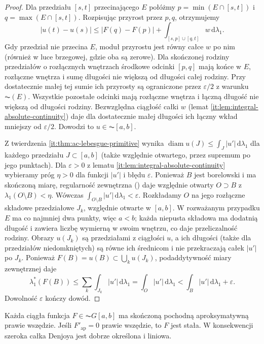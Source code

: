 \begin{proof}
Dla przedziału $[s,t]$ przecinającego $E$ połóżmy
$p=\min(E\cap[s,t])$ i $q=\max(E\cap[s,t])$. Rozpisując przyrost przez $p,q$, otrzymujemy
\[
 |u(t)-u(s)|\le |F(q)-F(p)|+
 \int_{[s,p]\cup[q,t]}w\,\mathrm d\lambda_1.
\]
Gdy przedział nie przecina $E$, moduł przyrostu jest równy całce $w$ po nim (również w luce brzegowej, gdzie oba są zerowe).
Dla skończonej rodziny przedziałów o rozłącznych wnętrzach środkowe odcinki $[p,q]$ mają końce w $E$, rozłączne wnętrza i sumę długości nie większą od długości całej rodziny. Przy dostatecznie małej tej sumie ich przyrosty są ograniczone przez $\varepsilon/2$ z warunku $\AC(E)$. Wszystkie pozostałe odcinki mają rozłączne wnętrza i łączną długość nie większą od długości rodziny. Bezwzględna ciągłość całki $w$ (lemat \ref{it:lem:integral-absolute-continuity}) daje dla dostatecznie małej długości ich łączny wkład mniejszy od $\varepsilon/2$. Dowodzi to $u\in\AC[a,b]$.

Z twierdzenia \ref{it:thm:ac-lebesgue-primitive} wynika $\operatorname{diam}u(J)\le\int_J|u'|\,\mathrm d\lambda_1$ dla każdego przedziału $J\subset[a,b]$ (także względnie otwartego, przez supremum po jego punktach).
Dla $\varepsilon>0$ z lematu \ref{it:lem:integral-absolute-continuity} wybieramy próg $\eta>0$ dla funkcji $|u'|$ i błędu $\varepsilon$. Ponieważ $B$ jest borelowski i ma skończoną miarę, regularność zewnętrzna () daje względnie otwarty $O\supset B$ z $\lambda_1(O\setminus B)<\eta$. Wówczas $\int_{O\setminus B}|u'|\,\mathrm d\lambda_1<\varepsilon$. Rozkładamy $O$ na jego rozłączne składowe przedziałowe $J_k$, względnie otwarte w $[a,b]$. W rozważanym przypadku $E$ ma co najmniej dwa punkty, więc $a<b$; każda niepusta składowa ma dodatnią długość i zawiera liczbę wymierną w swoim wnętrzu, co daje przeliczalność rodziny. Obrazy $u(J_k)$ są przedziałami z ciągłości $u$, a ich długości (także dla przedziałów niedomkniętych) są równe ich średnicom i nie przekraczają całek $|u'|$ po $J_k$. Ponieważ $F(B)=u(B)\subset\bigcup_k u(J_k)$, podaddytywność miary zewnętrznej daje
\[
 \lambda_1^*(F(B))\le\sum_k\int_{J_k}|u'|\,\mathrm d\lambda_1
 =\int_O|u'|\,\mathrm d\lambda_1
 <\int_B|u'|\,\mathrm d\lambda_1+\varepsilon.
\]
Dowolność $\varepsilon$ kończy dowód.
\end{proof}
\begin{twierdzenie}\label{it:thm:acg-uniqueness}
Każda ciągła funkcja $F\in\AC G[a,b]$ ma skończoną pochodną aproksymatywną prawie wszędzie. Jeśli $F'_{\mathrm{ap}}=0$ prawie wszędzie, to $F$ jest stała. W konsekwencji szeroka całka Denjoya jest dobrze określona i liniowa.
\end{twierdzenie}
